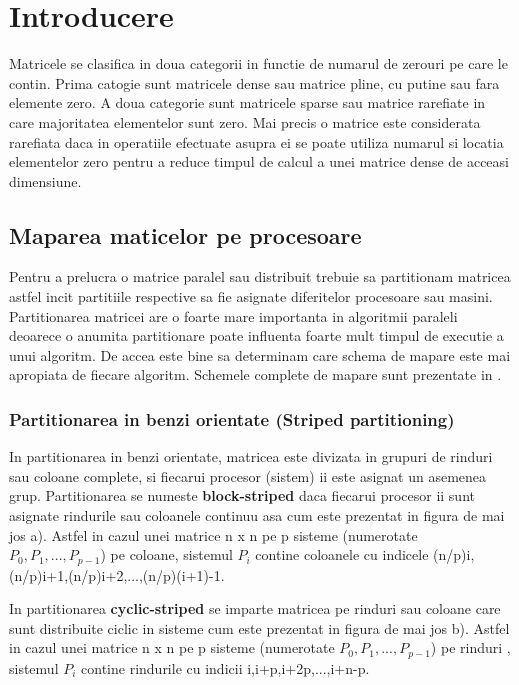 \chapter{Introducere}

\hspace{5mm}Matricele se clasifica in doua categorii in functie de 
numarul de zerouri pe care le contin. Prima catogie sunt matricele dense sau
matrice pline, cu putine sau fara elemente zero. A doua categorie sunt
matricele  sparse sau matrice rarefiate in care majoritatea elementelor sunt
zero. Mai precis o matrice este considerata rarefiata daca in operatiile
efectuate asupra ei se poate utiliza numarul si locatia elementelor zero
pentru a reduce timpul de calcul a unei matrice dense de acceasi dimensiune.
\section{Maparea maticelor pe procesoare}

\hspace{5mm}Pentru a prelucra o matrice paralel sau distribuit trebuie sa
partitionam matricea astfel incit partitiile respective sa fie asignate
diferitelor procesoare sau masini. Partitionarea matricei are o foarte mare
importanta in algoritmii paraleli deoarece o anumita partitionare poate
influenta foarte mult timpul de executie a unui algoritm. De accea este bine
sa determinam  care schema de mapare este mai apropiata de fiecare algoritm.
Schemele complete de mapare sunt prezentate in \cite[151-168]{kumar}.

\subsection{Partitionarea in benzi orientate (Striped partitioning)}

In partitionarea in benzi orientate, matricea este divizata in grupuri de
rinduri sau coloane complete, si fiecarui procesor (sistem) ii este asignat
un asemenea grup. Partitionarea se numeste {\bf block-striped} daca fiecarui
procesor ii sunt asignate rindurile sau coloanele continuu asa cum este
prezentat in figura de mai jos a). Astfel in cazul unei matrice n x n pe p
sisteme (numerotate $P_0,P_1,...,P_{p-1}$) pe coloane, sistemul $P_i$ contine
coloanele cu indicele (n/p)i,(n/p)i+1,(n/p)i+2,...,(n/p)(i+1)-1.

\label{partitionare-matrice}
 In partitionarea {\bf cyclic-striped} se imparte matricea pe
rinduri sau coloane care sunt distribuite ciclic in sisteme cum este prezentat
 in figura de mai jos b). Astfel in cazul unei matrice n x n pe p sisteme
(numerotate $P_0,P_1,...,P_{p-1}$) pe rinduri , sistemul $P_i$ contine
rindurile cu indicii i,i+p,i+2p,...,i+n-p.

